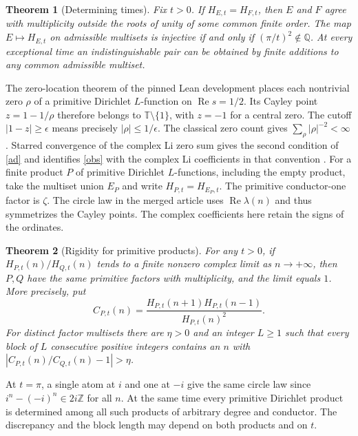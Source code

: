 \documentclass[11pt]{article}
\newtheorem{theorem}{Theorem}[section]
\newcommand{\T}{\mathbb T}
\newcommand{\Z}{\mathbb Z}
\newcommand{\Q}{\mathbb Q}
\begin{document}
\begin{theorem}[Determining times]\label{main}
Fix $t>0$. If $H_{E,t}=H_{F,t}$, then $E$ and $F$ agree with
multiplicity outside the roots of unity of some common finite order.
The map $E\mapsto H_{E,t}$ on admissible multisets is injective if and
only if $(\pi/t)^2\notin\Q$. At every exceptional time an
indistinguishable pair can be obtained by finite additions to any common
admissible multiset.
\end{theorem}

The zero-location theorem of the pinned Lean development \cite{vendor}
places each nontrivial zero $\rho$ of a primitive Dirichlet $L$-function
on $\operatorname{Re}s=1/2$. Its Cayley point $z=1-1/\rho$ therefore belongs
to $\T\setminus\{1\}$, with $z=-1$ for a central zero. The cutoff
$|1-z|\ge\epsilon$ means precisely $|\rho|\le1/\epsilon$.
The classical zero count gives $\sum_\rho|\rho|^{-2}<\infty$.
Starred convergence of the complex Li zero sum gives the second condition
of \eqref{ad} and identifies \eqref{obs} with the complex Li coefficients
in that convention \cite{lagarias}. For a finite product $P$ of primitive
Dirichlet $L$-functions, including the empty product, take the multiset
union $E_P$ and write $H_{P,t}=H_{E_P,t}$. The primitive conductor-one
factor is $\zeta$. The circle law in the merged article \cite{article}
uses $\operatorname{Re}\lambda(n)$ and thus symmetrizes the Cayley
points. The complex coefficients here retain the signs of the ordinates.

\begin{theorem}[Rigidity for primitive products]\label{rigid}
For any $t>0$, if $H_{P,t}(n)/H_{Q,t}(n)$ tends to a finite nonzero
complex limit as $n\to+\infty$, then $P,Q$ have the same primitive
factors with multiplicity, and the limit equals $1$. More precisely, put
\[
 C_{P,t}(n)=\frac{H_{P,t}(n+1)H_{P,t}(n-1)}{H_{P,t}(n)^2}.
\]
For distinct factor multisets there are $\eta>0$ and an integer $L\ge1$
such that every block of $L$ consecutive positive integers contains an
$n$ with $|C_{P,t}(n)/C_{Q,t}(n)-1|>\eta$.
\end{theorem}

At $t=\pi$, a single atom at $i$ and one at $-i$ give the same circle law
since $i^n-(-i)^n\in2i\Z$ for all $n$. At the same time every primitive
Dirichlet product is determined among all such products of arbitrary
degree and conductor. The discrepancy and the block length may depend
on both products and on $t$.
\end{document}

